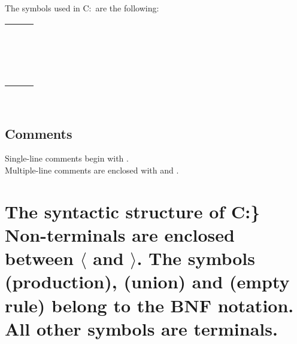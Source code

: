 \documentclass[a4paper,11pt]{article}
\begin{document}
{The symbols used in C:\Users\Semi\Documents{}\ are the following: \\

\begin{tabular}{lll}
{\symb{;}} &{\symb{\{}} &{\symb{\}}} \\
{\symb{(}} &{\symb{)}} &{\symb{{$=$}}} \\
{\symb{!}} &{\symb{{$+$}{$+$}}} &{\symb{{$-$}{$-$}}} \\
{\symb{\~{}}} &{\symb{*}} &{\symb{**}} \\
{\symb{/}} &{\symb{$\backslash$}} &{\symb{\%}} \\
{\symb{{$+$}}} &{\symb{{$-$}}} &{\symb{{$<$}{$<$}}} \\
{\symb{{$>$}{$>$}}} &{\symb{{$<$}}} &{\symb{{$>$}}} \\
{\symb{{$<$}{$=$}}} &{\symb{{$>$}{$=$}}} &{\symb{{$=$}{$=$}}} \\
{\symb{!{$=$}}} &{\symb{\&}} &{\symb{{$|$}}} \\
{\symb{\^}} &{\symb{\&\&}} &{\symb{{$|$}{$|$}}} \\
{\symb{\^\^}} &{\symb{{$-$}{$>$}}} &{\symb{{$<$}{$-$}}} \\
{\symb{[}} &{\symb{]}} &{\symb{..}} \\
{\symb{.}} &{\symb{,}} &{\symb{?}} \\
{\symb{:}} &{\symb{{$+$}{$=$}}} &{\symb{{$-$}{$=$}}} \\
{\symb{*{$=$}}} &{\symb{/{$=$}}} &{\symb{\%{$=$}}} \\
{\symb{\&{$=$}}} &{\symb{{$|$}{$=$}}} &{\symb{\^{$=$}}} \\
{\symb{{$<$}{$<$}{$=$}}} &{\symb{{$>$}{$>$}{$=$}}} & \\
\end{tabular}\\

\subsection*{Comments}
Single-line comments begin with {\symb{//}}. \\Multiple-line comments are  enclosed with {\symb{/*}} and {\symb{*/}}.

\section*{The syntactic structure of C:\Users\Semi\Documents{}\}
Non-terminals are enclosed between $\langle$ and $\rangle$. 
The symbols  {\arrow}  (production),  {\delimit}  (union) 
and {\emptyP} (empty rule) belong to the BNF notation. 
All other symbols are terminals.\\

}}
\end{document}
